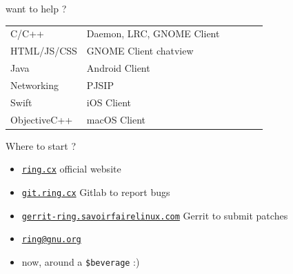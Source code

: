 \documentclass[pdf]{beamer}
\begin{document}
\begin{frame}{want to help ?}

\begin{table}
\centering
\begin{tabular}{llllll}
C/C++       & Daemon, LRC, GNOME Client \\
HTML/JS/CSS & GNOME Client chatview     \\
Java        & Android Client            \\
Networking  & PJSIP                     \\
Swift       & iOS Client                \\
ObjectiveC++& macOS Client
\end{tabular}
\end{table}

\end{frame}


\begin{frame}{Where to start ?}

\begin{itemize}
\item \href{https://ring.cx}{\texttt{ring.cx}} official website
\item \href{https://git.ring.cx}{\texttt{git.ring.cx}} Gitlab to report bugs
\item \href{https://gerrit-ring.savoirfairelinux.com}{\texttt{gerrit-ring.savoirfairelinux.com}} Gerrit to submit patches
\item \href{{mailto:ring@gnu.org}}{\texttt{ring@gnu.org}}
\item now, around a \texttt{\$beverage} :)
\end{itemize}

\end{frame}
\end{document}
